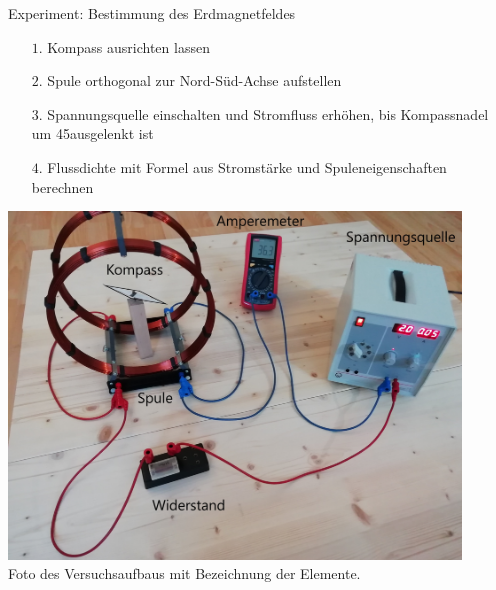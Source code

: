 \begin{frame}[fragile]{Experiment: Bestimmung des Erdmagnetfeldes}
\begin{minipage}{0.5\textwidth}
	{
\begin{itemize}[itemsep=1mm]
	\item[$1.$] Kompass ausrichten lassen
	\item[$2.$] Spule orthogonal zur Nord-Süd-Achse aufstellen
	\item[$3.$] Spannungsquelle einschalten und Stromfluss erhöhen, bis Kompassnadel um 45\degree ausgelenkt ist
	\item[$4.$] Flussdichte mit Formel aus Stromstärke und Spuleneigenschaften berechnen
\end{itemize}
}
\end{minipage}
\begin{minipage}{0.45\textwidth}
	\centering
	\includegraphics[width=0.9\textwidth]{images/papers/setup_labled.jpg}\\
	\small Foto des Versuchsaufbaus mit Bezeichnung der Elemente.
\end{minipage}
\end{frame}
